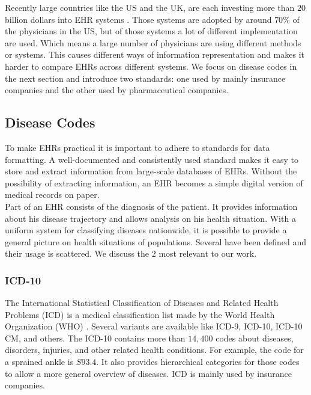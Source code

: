 Recently large countries like the US and the UK, are each investing more than $20$ billion dollars into EHR systems \cite{EHRworld:article}. Those systems are adopted by around $70$\% of the physicians in the US, but of those systems a lot of different implementation are used. Which means a large number of physicians are using different methods or systems. This causes different ways of information representation and makes it harder to compare EHRs across different systems. We focus on disease codes in the next section and introduce two standards: one used by mainly insurance companies and the other used by pharmaceutical companies. 


\subsection{Disease Codes}
\label{sec:diseaseCodes}

To make EHRs practical it is important to adhere to standards for data formatting. A well-documented and consistently used standard makes it easy to store and extract information from large-scale databases of EHRs. Without the possibility of extracting information, an EHR becomes a simple digital version of medical records on paper. \\
Part of an EHR consists of the diagnosis of the patient. It provides information about his disease trajectory and allows analysis on his health situation. With a uniform system for classifying diseases nationwide, it is possible to provide a general picture on health situations of populations. Several have been defined and their usage is scattered. We discuss the $2$ most relevant to our work.

\subsubsection{ICD-10}

The International Statistical Classification of Diseases and Related Health Problems (ICD) is a medical classification list made by the World Health Organization (WHO) \cite{WHO_ICD:online}. Several variants are available like ICD-9, ICD-10, ICD-10 CM, and others. The ICD-10 contains more than $14,400$ codes about diseases, disorders, injuries, and other related health conditions. For example, the code for a sprained ankle is $S93.4$. It also provides hierarchical categories for those codes to allow a more general overview of diseases. ICD is mainly used by insurance companies.



